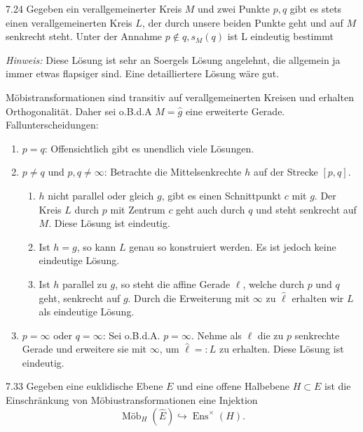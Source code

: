 \begin{exercise}{7.2}{4}
    Gegeben ein verallgemeinerter Kreis $M$ und zwei Punkte $p, q$ gibt es
    stets einen verallgemeinerten Kreis $L$, der durch unsere beiden Punkte geht und
    auf $M$ senkrecht steht. Unter der Annahme $p \notin {q, s_M(q)}$ ist L eindeutig bestimmt
\end{exercise}

\textit{Hinweis:} Diese Lösung ist sehr an Soergels Lösung angelehnt, die allgemein ja immer etwas flapsiger sind. Eine detailliertere Lösung wäre gut.
\bigskip

Möbistransformationen sind transitiv auf verallgemeinerten Kreisen und erhalten Orthogonalität. Daher sei o.B.d.A $M = \hat{g}$ eine erweiterte Gerade.
Fallunterscheidungen:
\begin{enumerate}
    \item $p=q$: Offensichtlich gibt es unendlich viele Lösungen.
    \item $p \neq q$ und $p,q \neq \infty$: Betrachte die Mittelsenkrechte $h$ auf der Strecke $[p,q]$.
    \begin{enumerate}
        \item $h$ nicht parallel oder gleich $g$, gibt es einen Schnittpunkt $c$ mit $g$. Der Kreis $L$ durch $p$ mit Zentrum $c$ geht auch durch $q$ und steht senkrecht auf $M$. Diese Lösung ist eindeutig.
        \item Ist $h=g$, so kann $L$ genau so konstruiert werden. Es ist jedoch keine eindeutige Lösung.
        \item Ist $h$ parallel zu $g$, so steht die affine Gerade $\ell$, welche durch $p$ und $q$ geht, senkrecht auf $g$. Durch die Erweiterung mit $\infty$ zu $\widehat{\ell}$ erhalten wir $L$ als eindeutige Lösung.
    \end{enumerate}
    \item $p=\infty$ oder $q=\infty$: Sei o.B.d.A. $p = \infty$. Nehme als $\ell$ die zu $p$ senkrechte Gerade und erweitere sie mit $\infty$, um $\hat{\ell} =: L$ zu erhalten. Diese Lösung ist eindeutig.
\end{enumerate}

\begin{exercise}{7.3}{3}
    Gegeben eine euklidische Ebene \(E\) und eine offene Halbebene
    \(H \subset E\) ist die Einschränkung von Möbiustransformationen eine Injektion
    \[
        \operatorname{Möb}_H(\widehat E)
        \hookrightarrow
        \operatorname{Ens}^{\times}(H).
    \]
\end{exercise}

